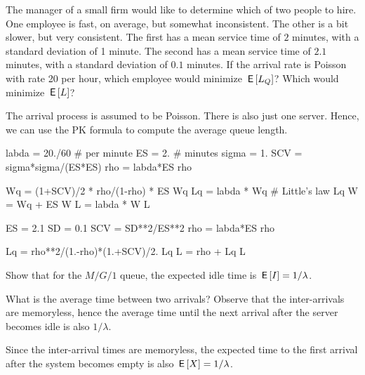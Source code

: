 \begin{exercise}[Hall 5.16] \label{ex:46}The manager of a small firm would like to determine which of two people to hire.
  One employee is fast, on average, but somewhat inconsistent.
  The other is a bit slower, but very consistent.
  The first has a mean service time of $2$ minutes, with a standard deviation of 1 minute.
  The second has a mean service time of $2.1$ minutes, with a standard deviation of $0.1$ minutes.
  If the arrival rate is Poisson with rate 20 per hour, which employee would minimize $\,\mathsf{E}\left[L_Q\right]$?
  Which would minimize $\,\mathsf{E}\left[L\right]$?
\begin{solution}
    The arrival process is assumed to be Poisson. There is also
    just one server. Hence, we can use the PK formula to compute the average queue length.

\begin{pyconsole}
labda = 20./60 # per minute
ES = 2. # minutes
sigma = 1.
SCV = sigma*sigma/(ES*ES)
rho = labda*ES
rho

Wq = (1+SCV)/2 * rho/(1-rho) * ES
Wq
Lq = labda * Wq # Little's law
Lq
W = Wq + ES
W
L = labda * W
L
\end{pyconsole}


\begin{pyconsole}
ES = 2.1
SD = 0.1
SCV = SD**2/ES**2
rho = labda*ES
rho

Lq = rho**2/(1.-rho)*(1.+SCV)/2.
Lq
L = rho + Lq
L
\end{pyconsole}

\end{solution}
\end{exercise}


\begin{extra}
  Show that for the $M/G/1$ queue, the expected idle time is
  $\,\mathsf{E}\left[I\right] = 1/\lambda$.  
\begin{hint}
What is the average time between two
    arrivals? Observe that the inter-arrivals are memoryless, hence the
    average time until the next arrival after the server becomes idle
    is also $1/\lambda$.
\end{hint}
\begin{solution}
    Since the inter-arrival times are memoryless, the expected time to the first arrival after the system becomes empty is also $\,\mathsf{E}\left[X\right]=1/\lambda$.
\end{solution}
\end{extra}

